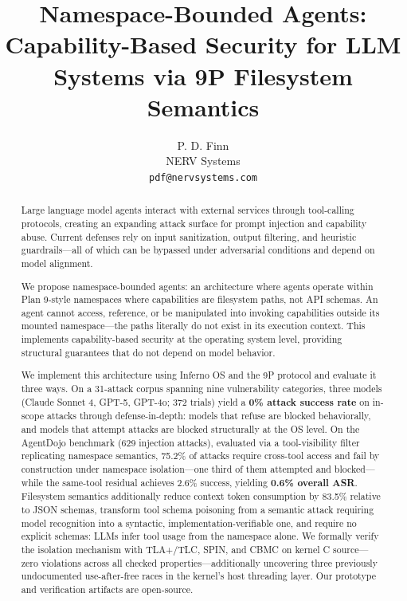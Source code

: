 \documentclass{article}
\title{Namespace-Bounded Agents: Capability-Based Security for LLM Systems via 9P Filesystem Semantics}
\author{
  P. D. Finn \\
  NERV Systems \\
  \texttt{pdf@nervsystems.com}
}
\begin{document}
\maketitle

\begin{abstract}
Large language model agents interact with external services through tool-calling protocols, creating an expanding attack surface for prompt injection and capability abuse. Current defenses rely on input sanitization, output filtering, and heuristic guardrails---all of which can be bypassed under adversarial conditions and depend on model alignment.

We propose namespace-bounded agents: an architecture where agents operate within Plan 9-style namespaces where capabilities are filesystem paths, not API schemas. An agent cannot access, reference, or be manipulated into invoking capabilities outside its mounted namespace---the paths literally do not exist in its execution context. This implements capability-based security at the operating system level, providing structural guarantees that do not depend on model behavior.

We implement this architecture using Inferno OS and the 9P protocol and evaluate it three ways. On a 31-attack corpus spanning nine vulnerability categories, three models (Claude Sonnet 4, GPT-5, GPT-4o; 372 trials) yield a \textbf{0\% attack success rate} on in-scope attacks through defense-in-depth: models that refuse are blocked behaviorally, and models that attempt attacks are blocked structurally at the OS level. On the AgentDojo benchmark (629 injection attacks), evaluated via a tool-visibility filter replicating namespace semantics, 75.2\% of attacks require cross-tool access and fail by construction under namespace isolation---one third of them attempted and blocked---while the same-tool residual achieves 2.6\% success, yielding \textbf{0.6\% overall ASR}. Filesystem semantics additionally reduce context token consumption by 83.5\% relative to JSON schemas, transform tool schema poisoning from a semantic attack requiring model recognition into a syntactic, implementation-verifiable one, and require no explicit schemas: LLMs infer tool usage from the namespace alone. We formally verify the isolation mechanism with TLA+/TLC, SPIN, and CBMC on kernel C source---zero violations across all checked properties---additionally uncovering three previously undocumented use-after-free races in the kernel's host threading layer. Our prototype and verification artifacts are open-source.
\end{abstract}
\end{document}
